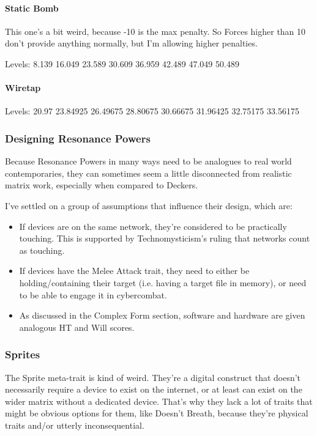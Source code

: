 \begin{multicols*}{2}
	\paragraph{Static Bomb}
	This one's a bit weird, because -10 is the max penalty. So Forces higher than 10 don't provide anything normally, but I'm allowing higher penalties.
	
	Levels: 8.139 16.049 23.589 30.609 36.959 42.489 47.049 50.489
	
	\paragraph{Wiretap}
	Levels: 20.97 23.84925 26.49675 28.80675 30.66675 31.96425 32.75175 33.56175
	
	\subsubsection{Designing Resonance Powers}
	
	Because Resonance Powers in many ways need to be analogues to real world contemporaries, they can sometimes seem a little disconnected from realistic matrix work, especially when compared to Deckers.
	
	I've settled on a group of assumptions that influence their design, which are:
	
	\begin{itemize}
		\item If devices are on the same network, they're considered to be practically touching. This is supported by Technomysticism's ruling that networks count as touching.
		\item If devices have the Melee Attack trait, they need to either be holding/containing their target (i.e. having a target file in memory), or need to be able to engage it in cybercombat.
		\item As discussed in the Complex Form section, software and hardware are given analogous HT and Will scores.
	\end{itemize}
	
	\subsubsection{Sprites}
	
	The Sprite meta-trait is kind of weird. They're a digital construct that doesn't necessarily require a device to exist on the internet, or at least can exist on the wider matrix without a dedicated device. That's why they lack a lot of traits that might be obvious options for them, like Doesn't Breath, because they're physical traits and/or utterly inconsequential.
	

\end{multicols*}

